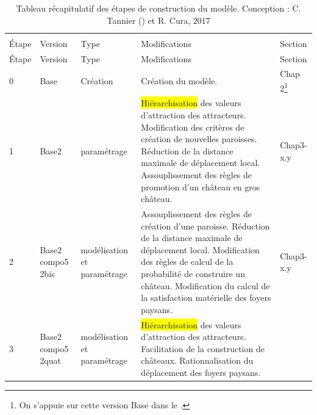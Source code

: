 	
\pagebreak
\begin{footnotesize}
	\begin{longtable}{ m{} m{}  m{}  m{}  m{}  }
		\caption{Tableau récapitulatif des étapes de construction du modèle. Conception : C. Tannier () et R. Cura, 2017}\\
		\label{table:etapes-construction}\\
		Étape & Version & Type      & Modifications                                                 & Section                                                                                   \\
		\endfirsthead
		Étape & Version & Type      & Modifications                                                 & Section                                                                                   \\
		\endhead			
		\hline
		0      & Base    & Création & Création du modèle. \fixref{Cf. tableau 14 de Tannier 2017} & Chap 2\footnote{On s'appuie sur cette version \og Base\fg{} dans le \fixref{chapitre 2}.} \\
		\hline
		1 & Base2 & paramétrage & \colorbox{yellow}{Hiérarchisation} des valeurs d'attraction des attracteurs. \newline
		Modification des critères de création de nouvelles paroisses. \newline
		Réduction de la distance maximale de déplacement local. \newline
		Assouplissement des règles de promotion d'un château en gros château. & Chap3-x.y\\
		\hline
		2 & Base2 compo5 2bis & modélisation et paramétrage & Assouplissement des règles de création d'une paroisse.\newline
		Réduction de la distance maximale de déplacement local. \newline
		Modification des règles de calcul de la probabilité de construire un château.\newline
		Modification du calcul de la satisfaction matérielle des foyers paysans. & Chap3-x.y\\
		\hline
		3 & Base2 compo5 2quat & modélisation et paramétrage & \colorbox{yellow}{Hiérarchisation} des valeurs d'attraction des attracteurs. \newline
		Facilitation de la construction de châteaux. \newline
		Rationnalisation du déplacement des foyers paysans. \newline

\end{longtable}
\end{footnotesize}
